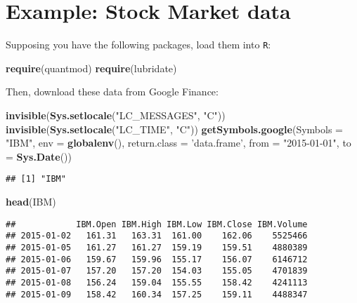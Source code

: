 \documentclass[]{book}
\newenvironment{Shaded}{\begin{snugshade}}{\end{snugshade}}
\newcommand{\KeywordTok}[1]{\textcolor[rgb]{0.13,0.29,0.53}{\textbf{{#1}}}}
\newcommand{\DataTypeTok}[1]{\textcolor[rgb]{0.13,0.29,0.53}{{#1}}}
\newcommand{\StringTok}[1]{\textcolor[rgb]{0.31,0.60,0.02}{{#1}}}
\newcommand{\NormalTok}[1]{{#1}}
\begin{document}
\section{Example: Stock Market data}\label{example-stock-market-data}

Supposing you have the following packages, load them into \texttt{R}:

\begin{Shaded}
\begin{Highlighting}[]
\KeywordTok{require}\NormalTok{(quantmod)}
\KeywordTok{require}\NormalTok{(lubridate)}
\end{Highlighting}
\end{Shaded}

Then, download these data from Google Finance:

\begin{Shaded}
\begin{Highlighting}[]
\KeywordTok{invisible}\NormalTok{(}\KeywordTok{Sys.setlocale}\NormalTok{(}\StringTok{"LC_MESSAGES"}\NormalTok{, }\StringTok{"C"}\NormalTok{))}
\KeywordTok{invisible}\NormalTok{(}\KeywordTok{Sys.setlocale}\NormalTok{(}\StringTok{"LC_TIME"}\NormalTok{, }\StringTok{"C"}\NormalTok{))}
\KeywordTok{getSymbols.google}\NormalTok{(}\DataTypeTok{Symbols =} \StringTok{"IBM"}\NormalTok{,}
                  \DataTypeTok{env =} \KeywordTok{globalenv}\NormalTok{(),}
                  \DataTypeTok{return.class =} \StringTok{'data.frame'}\NormalTok{,}
                  \DataTypeTok{from =} \StringTok{"2015-01-01"}\NormalTok{,}
                  \DataTypeTok{to =} \KeywordTok{Sys.Date}\NormalTok{())}
\end{Highlighting}
\end{Shaded}

\begin{verbatim}
## [1] "IBM"
\end{verbatim}

\begin{Shaded}
\begin{Highlighting}[]
\KeywordTok{head}\NormalTok{(IBM)}
\end{Highlighting}
\end{Shaded}

\begin{verbatim}
##            IBM.Open IBM.High IBM.Low IBM.Close IBM.Volume
## 2015-01-02   161.31   163.31  161.00    162.06    5525466
## 2015-01-05   161.27   161.27  159.19    159.51    4880389
## 2015-01-06   159.67   159.96  155.17    156.07    6146712
## 2015-01-07   157.20   157.20  154.03    155.05    4701839
## 2015-01-08   156.24   159.04  155.55    158.42    4241113
## 2015-01-09   158.42   160.34  157.25    159.11    4488347
\end{verbatim}
\end{document}
